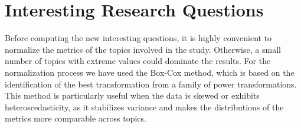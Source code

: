 







%
%
\section{Interesting Research Questions}

Before computing the new interesting questions, it is highly convenient to normalize the metrics of the topics involved in the study. Otherwise, a small number of topics with extreme values could dominate the results. For the normalization process we have used the Box-Cox method, which is based on the identification of the best transformation from a family of power transformations. This method is particularly useful when the data is skewed or exhibits heteroscedasticity, as it stabilizes variance and makes the distributions of the metrics more comparable across topics.

